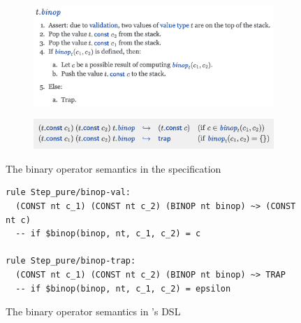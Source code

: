 
\begin{figure}[t]
  \centering
  \begin{subfigure}{\columnwidth}
    \centering
    \includegraphics[width=\columnwidth]{figs/spec-prose.png}
\vspace*{1em}
  \end{subfigure}

  \begin{subfigure}{\columnwidth}
    \centering
    \includegraphics[width=\columnwidth]{figs/spec-formal.png}
  \end{subfigure}
\caption{The binary operator semantics in the specification}
\label{fig:spec}
\end{figure}

\begin{figure}[t]
\small
\begin{verbatim}
rule Step_pure/binop-val:
  (CONST nt c_1) (CONST nt c_2) (BINOP nt binop) ~> (CONST nt c)
  -- if $binop(binop, nt, c_1, c_2) = c

rule Step_pure/binop-trap:
  (CONST nt c_1) (CONST nt c_2) (BINOP nt binop) ~> TRAP
  -- if $binop(binop, nt, c_1, c_2) = epsilon
\end{verbatim}
\caption{The binary operator semantics in \dslname's DSL}
\label{fig:dsl}
\end{figure}

